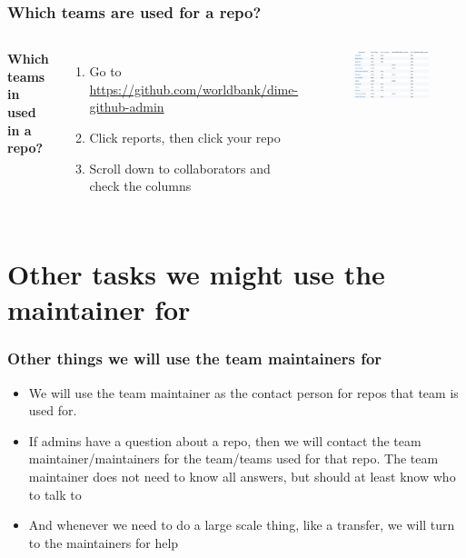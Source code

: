\documentclass[aspectratio=169]{beamer} %
\begin{document}
\begin{frame}
	\frametitle{Which teams are used for a repo?}
	\begin{columns}[c]
		\textbf{Which teams in used in a repo?}
		\begin{enumerate}
			\item Go to \url{https://github.com/worldbank/dime-github-admin}
			\item Click reports, then click your repo
			\item Scroll down to collaborators and check the columns
		\end{enumerate}
		
		\begin{figure}
			\centering
			\includegraphics[width=1\linewidth]{./img/which-teams-in-repo}
		\end{figure}
	\end{columns}		
\end{frame}



\section{Other tasks we might use the maintainer for }

\begin{frame}
	\frametitle{Other things we will use the team maintainers for}
	
	\begin{itemize}
		\item We will use the team maintainer as the contact person for repos that team is used for.
		
		\item If admins have a question about a repo, then we will contact the team maintainer/maintainers for the team/teams used for that repo. The team maintainer does not need to know all answers, but should at least know who to talk to 
		
		\item And whenever we need to do a large scale thing, like a transfer, we will turn to the maintainers for help

	\end{itemize}
\end{frame}
\end{document}
